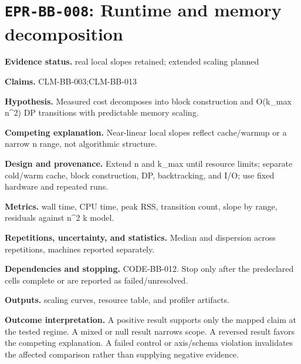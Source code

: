 \section[\texttt{EPR-BB-008}]{\texttt{EPR-BB-008}: Runtime and memory decomposition}
\textbf{Evidence status.} real local slopes retained; extended scaling planned\par
\textbf{Claims.} CLM-BB-003;CLM-BB-013\par
\textbf{Hypothesis.} Measured cost decomposes into block construction and O(k\_max n\textasciicircum{}2) DP transitions with predictable memory scaling.\par
\textbf{Competing explanation.} Near-linear local slopes reflect cache/warmup or a narrow n range, not algorithmic structure.\par
\textbf{Design and provenance.} Extend n and k\_max until resource limits; separate cold/warm cache, block construction, DP, backtracking, and I/O; use fixed hardware and repeated runs.\par
\textbf{Metrics.} wall time, CPU time, peak RSS, transition count, slope by range, residuals against n\textasciicircum{}2 k model.\par
\textbf{Repetitions, uncertainty, and statistics.} Median and dispersion across repetitions, machines reported separately.\par
\textbf{Dependencies and stopping.} CODE-BB-012. Stop only after the predeclared cells complete or are reported as failed/unresolved.\par
\textbf{Outputs.} scaling curves, resource table, and profiler artifacts.\par
\textbf{Outcome interpretation.} A positive result supports only the mapped claim at the tested regime. A mixed or null result narrows scope. A reversed result favors the competing explanation. A failed control or axis/schema violation invalidates the affected comparison rather than supplying negative evidence.

